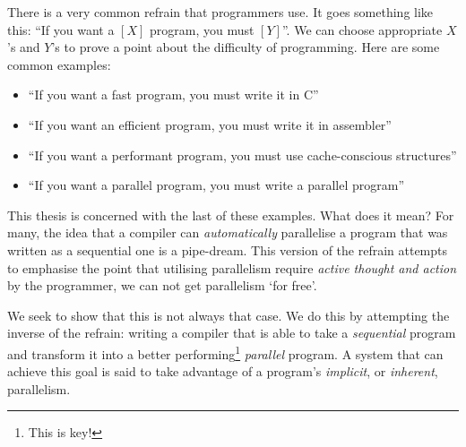 There is a very common refrain that programmers use. It goes something like
this: ``If you want a $[X]$ program, you must $[Y]$''. We can choose
appropriate $X$'s and $Y$'s to prove a point about the difficulty of
programming. Here are some common examples:

\begin{itemize}
  \item ``If you want a fast program, you must write it in C''
  \item ``If you want an efficient program, you must write it in
            assembler''
  \item ``If you want a performant program, you must use
            cache-conscious structures''
  \item ``If you want a parallel program, you must write a parallel
            program''
\end{itemize}

This thesis is concerned with the last of these examples. What does it mean?
For many, the idea that a compiler can \emph{automatically} parallelise a
program that was written as a sequential one is a pipe-dream. This version
of the refrain attempts to emphasise the point that utilising parallelism
require \emph{active thought and action} by the programmer, we can not
get parallelism `for free'.

We seek to show that this is not always that case. We do this by attempting
the inverse of the refrain: writing a compiler that is able to take a
\emph{sequential} program and transform it into a better
performing\footnote{This is key!} \emph{parallel} program.  A system that
can achieve this goal is said to take advantage of a program's
\emph{implicit}, or \emph{inherent}, parallelism.

